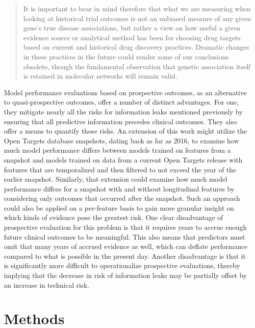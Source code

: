 \documentclass{article}
\begin{document}
\begin{quote}
  It is important to bear in mind therefore that what we are measuring when looking at historical trial outcomes is not an unbiased measure of any given gene's true disease associations, but rather a view on how useful a given evidence source or analytical method has been for choosing drug targets based on current and historical drug discovery practices. Dramatic changes in these practices in the future could render some of our conclusions obsolete, though the fundamental observation that genetic association itself is retained in molecular networks will remain valid.
\end{quote}

Model performance evaluations based on prospective outcomes, as an alternative to quasi-prospective outcomes, offer a number of distinct advantages. For one, they mitigate nearly all the risks for information leaks mentioned previously by ensuring that all predictive information precedes clinical outcomes. They also offer a means to quantify those risks. An extension of this work might utilize the Open Targets database snapshots, dating back as far as 2016, to examine how much model performance differs between models trained on features from a snapshot and models trained on data from a current Open Targets release with features that are temporalized and then filtered to not exceed the year of the earlier snapshot. Similarly, that extension could examine how much model performance differs for a snapshot with and without longitudinal features by considering only outcomes that occurred after the snapshot. Such an approach could also be applied on a per-feature basis to gain more granular insight on which kinds of evidence pose the greatest risk. One clear disadvantage of prospective evaluation for this problem is that it requires years to accrue enough future clinical outcomes to be meaningful. This also means that predictors must omit that many years of accrued evidence as well, which can deflate performance compared to what is possible in the present day. Another disadvantage is that it is significantly more difficult to operationalize prospective evaluations, thereby implying that the decrease in risk of information leaks may be partially offset by an increase in technical risk.

\section{Methods}
\label{sec:methods}
\end{document}
